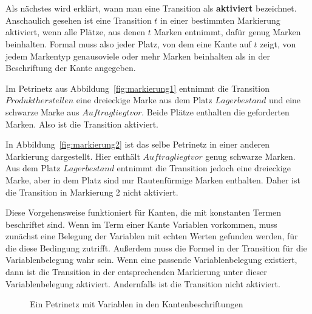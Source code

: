 	\\\\
	Als nächstes wird erklärt, wann man eine Transition als \textbf{aktiviert} bezeichnet. Anschaulich gesehen ist eine Transition $t$ in einer bestimmten Markierung aktiviert, wenn alle Plätze, aus denen $t$ Marken entnimmt, dafür genug Marken beinhalten.
	Formal muss also jeder Platz, von dem eine Kante auf $t$ zeigt, von jedem Markentyp genausoviele oder mehr Marken beinhalten als in der Beschriftung der Kante angegeben.

	Im Petrinetz aus Abbildung~\ref{fig:markierung1} entnimmt die Transition $Produkt herstellen$ eine dreieckige Marke aus dem Platz $Lagerbestand$ und eine schwarze Marke aus $Auftrag liegt vor$. Beide Plätze enthalten die geforderten Marken. Also ist die Transition aktiviert.

	In Abbildung~\ref{fig:markierung2} ist das selbe Petrinetz in einer anderen Markierung dargestellt. Hier enthält $Auftrag liegt vor$ genug schwarze Marken. Aus dem Platz $Lagerbestand$ entnimmt die Transition jedoch eine dreieckige Marke, aber in dem Platz sind nur Rautenfürmige Marken enthalten. Daher ist die Transition in Markierung 2 nicht aktiviert.

	Diese Vorgehensweise funktioniert für Kanten, die mit konstanten Termen beschriftet sind. Wenn im Term einer Kante Variablen vorkommen, muss zunächst eine Belegung der Variablen mit echten Werten gefunden werden, für die diese Bedingung zutrifft. Außerdem muss die Formel in der Transition für die Variablenbelegung wahr sein. Wenn eine passende Variablenbelegung existiert, dann ist die Transition in der entsprechenden Markierung unter dieser Variablenbelegung aktiviert. Andernfalls ist die Transition nicht aktiviert.

	\begin{figure}[h]
		\centering
		\caption{Ein Petrinetz mit Variablen in den Kantenbeschriftungen}
		\label{fig:varkanten1}
	\end{figure}


